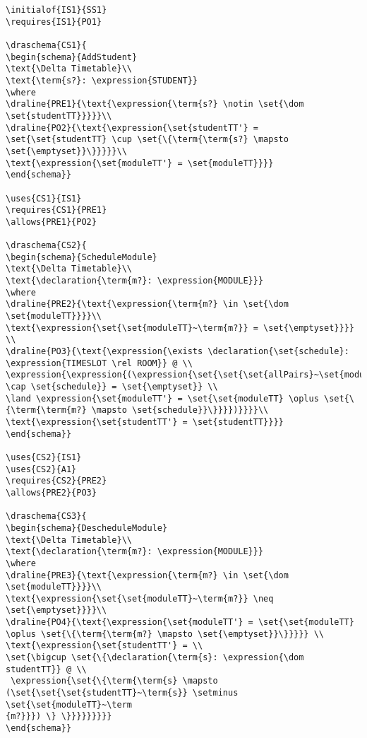 \begin{verbatim}
\initialof{IS1}{SS1}
\requires{IS1}{PO1}

\draschema{CS1}{
\begin{schema}{AddStudent}
\text{\Delta Timetable}\\
\text{\term{s?}: \expression{STUDENT}}
\where
\draline{PRE1}{\text{\expression{\term{s?} \notin \set{\dom \set{studentTT}}}}}\\
\draline{PO2}{\text{\expression{\set{studentTT'} = \set{\set{studentTT} \cup \set{\{\term{\term{s?} \mapsto \set{\emptyset}}\}}}}}\\
\text{\expression{\set{moduleTT'} = \set{moduleTT}}}}
\end{schema}}

\uses{CS1}{IS1}
\requires{CS1}{PRE1}
\allows{PRE1}{PO2}

\draschema{CS2}{
\begin{schema}{ScheduleModule}
\text{\Delta Timetable}\\
\text{\declaration{\term{m?}: \expression{MODULE}}}
\where
\draline{PRE2}{\text{\expression{\term{m?} \in \set{\dom \set{moduleTT}}}}\\
\text{\expression{\set{\set{moduleTT}~\term{m?}} = \set{\emptyset}}}} \\
\draline{PO3}{\text{\expression{\exists \declaration{\set{schedule}: \expression{TIMESLOT \rel ROOM}} @ \\
\expression{\expression{(\expression{\set{\set{\set{allPairs}~\set{moduleTT}} \cap \set{schedule}} = \set{\emptyset}} \\
\land \expression{\set{moduleTT'} = \set{\set{moduleTT} \oplus \set{\{\term{\term{m?} \mapsto \set{schedule}}\}}}})}}}}\\
\text{\expression{\set{studentTT'} = \set{studentTT}}}}
\end{schema}}

\uses{CS2}{IS1}
\uses{CS2}{A1}
\requires{CS2}{PRE2}
\allows{PRE2}{PO3}

\draschema{CS3}{
\begin{schema}{DescheduleModule}
\text{\Delta Timetable}\\
\text{\declaration{\term{m?}: \expression{MODULE}}}
\where
\draline{PRE3}{\text{\expression{\term{m?} \in \set{\dom \set{moduleTT}}}}\\
\text{\expression{\set{\set{moduleTT}~\term{m?}} \neq \set{\emptyset}}}}\\
\draline{PO4}{\text{\expression{\set{moduleTT'} = \set{\set{moduleTT} \oplus \set{\{\term{\term{m?} \mapsto \set{\emptyset}}\}}}}} \\
\text{\expression{\set{studentTT'} = \\
\set{\bigcup \set{\{\declaration{\term{s}: \expression{\dom studentTT}} @ \\
 \expression{\set{\{\term{\term{s} \mapsto (\set{\set{\set{studentTT}~\term{s}} \setminus \set{\set{moduleTT}~\term
{m?}}}) \} \}}}}}}}}}
\end{schema}}


\end{verbatim}
